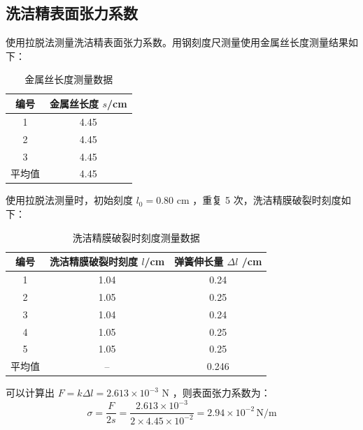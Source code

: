 \documentclass[a4paper]{extarticle}
\begin{document}
    \subsection{洗洁精表面张力系数}
    \hspace{2em}
    使用拉脱法测量洗洁精表面张力系数。用钢刻度尺测量使用金属丝长度测量结果如下：
    \begin{table}[H]
        \centering
        \caption{金属丝长度测量数据}
        \begin{tabular}{cc}
            \toprule
            编号 & 金属丝长度 $s$/cm\\
            \midrule
            1 & 4.45\\
            2 & 4.45\\
            3 & 4.45\\
            \midrule
            平均值 & 4.45\\
            \bottomrule
        \end{tabular}
    \end{table}
    \hspace{2em}
    使用拉脱法测量时，初始刻度 $l_0 = 0.80$ cm ，重复 5 次，洗洁精膜破裂时刻度如下：
    \begin{table}[H]
        \centering
        \caption{洗洁精膜破裂时刻度测量数据}
        \begin{tabular}{ccc}
            \toprule
            编号 & 洗洁精膜破裂时刻度 $l$/cm & 弹簧伸长量 $\Delta l$ /cm\\
            \midrule
            1 & 1.04 & 0.24\\
            2 & 1.05 & 0.25\\
            3 & 1.04 & 0.24\\
            4 & 1.05 & 0.25\\
            5 & 1.05 & 0.25\\
            \midrule
            平均值 & -- & 0.246\\
            \bottomrule
        \end{tabular}
    \end{table}
    可以计算出 $F=k\Delta l=2.613\times10^{-3}$ N ，则表面张力系数为：
    \begin{equation*}
        \sigma=\frac{F}{2s}=\frac{2.613\times10^{-3}}{2\times4.45\times10^{-2}}=2.94\times10^{-2} \,\text{N/m}
    \end{equation*}
\end{document}
